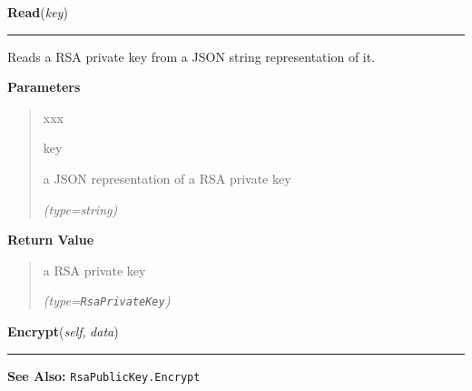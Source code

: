     \label{keyczar:keys:RsaPrivateKey:Read}

    \vspace{0.5ex}

\hspace{.8\funcindent}\begin{boxedminipage}{\funcwidth}

    \raggedright \textbf{Read}(\textit{key})

    \vspace{-1.5ex}

    \rule{\textwidth}{0.5\fboxrule}
\setlength{\parskip}{2ex}
    Reads a RSA private key from a JSON string representation of it.

\setlength{\parskip}{1ex}
      \textbf{Parameters}
      \vspace{-1ex}

      \begin{quote}
        \begin{Ventry}{xxx}

          \item[key]

          a JSON representation of a RSA private key

            {\it (type=string)}

        \end{Ventry}

      \end{quote}

      \textbf{Return Value}
    \vspace{-1ex}

      \begin{quote}
      a RSA private key

      {\it (type=\texttt{RsaPrivateKey})}

      \end{quote}

    \end{boxedminipage}

    \label{keyczar:keys:RsaPrivateKey:Encrypt}

    \vspace{0.5ex}

\hspace{.8\funcindent}\begin{boxedminipage}{\funcwidth}

    \raggedright \textbf{Encrypt}(\textit{self}, \textit{data})

    \vspace{-1.5ex}

    \rule{\textwidth}{0.5\fboxrule}
\setlength{\parskip}{2ex}
\setlength{\parskip}{1ex}
\textbf{See Also:} \texttt{RsaPublicKey.Encrypt}



    \end{boxedminipage}

